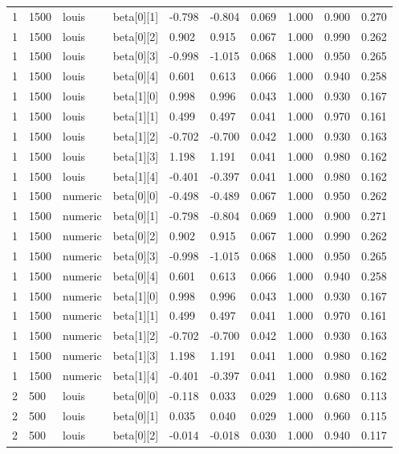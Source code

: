 \begin{table}
\begin{tabular}{llllllllll}
1 & 1500 & louis & beta[0][1] & -0.798 & -0.804 & 0.069 & 1.000 & 0.900 & 0.270 \\
1 & 1500 & louis & beta[0][2] & 0.902 & 0.915 & 0.067 & 1.000 & 0.990 & 0.262 \\
1 & 1500 & louis & beta[0][3] & -0.998 & -1.015 & 0.068 & 1.000 & 0.950 & 0.265 \\
1 & 1500 & louis & beta[0][4] & 0.601 & 0.613 & 0.066 & 1.000 & 0.940 & 0.258 \\
1 & 1500 & louis & beta[1][0] & 0.998 & 0.996 & 0.043 & 1.000 & 0.930 & 0.167 \\
1 & 1500 & louis & beta[1][1] & 0.499 & 0.497 & 0.041 & 1.000 & 0.970 & 0.161 \\
1 & 1500 & louis & beta[1][2] & -0.702 & -0.700 & 0.042 & 1.000 & 0.930 & 0.163 \\
1 & 1500 & louis & beta[1][3] & 1.198 & 1.191 & 0.041 & 1.000 & 0.980 & 0.162 \\
1 & 1500 & louis & beta[1][4] & -0.401 & -0.397 & 0.041 & 1.000 & 0.980 & 0.162 \\
1 & 1500 & numeric & beta[0][0] & -0.498 & -0.489 & 0.067 & 1.000 & 0.950 & 0.262 \\
1 & 1500 & numeric & beta[0][1] & -0.798 & -0.804 & 0.069 & 1.000 & 0.900 & 0.271 \\
1 & 1500 & numeric & beta[0][2] & 0.902 & 0.915 & 0.067 & 1.000 & 0.990 & 0.262 \\
1 & 1500 & numeric & beta[0][3] & -0.998 & -1.015 & 0.068 & 1.000 & 0.950 & 0.265 \\
1 & 1500 & numeric & beta[0][4] & 0.601 & 0.613 & 0.066 & 1.000 & 0.940 & 0.258 \\
1 & 1500 & numeric & beta[1][0] & 0.998 & 0.996 & 0.043 & 1.000 & 0.930 & 0.167 \\
1 & 1500 & numeric & beta[1][1] & 0.499 & 0.497 & 0.041 & 1.000 & 0.970 & 0.161 \\
1 & 1500 & numeric & beta[1][2] & -0.702 & -0.700 & 0.042 & 1.000 & 0.930 & 0.163 \\
1 & 1500 & numeric & beta[1][3] & 1.198 & 1.191 & 0.041 & 1.000 & 0.980 & 0.162 \\
1 & 1500 & numeric & beta[1][4] & -0.401 & -0.397 & 0.041 & 1.000 & 0.980 & 0.162 \\
2 & 500 & louis & beta[0][0] & -0.118 & 0.033 & 0.029 & 1.000 & 0.680 & 0.113 \\
2 & 500 & louis & beta[0][1] & 0.035 & 0.040 & 0.029 & 1.000 & 0.960 & 0.115 \\
2 & 500 & louis & beta[0][2] & -0.014 & -0.018 & 0.030 & 1.000 & 0.940 & 0.117 \\

\end{tabular}
\end{table}
